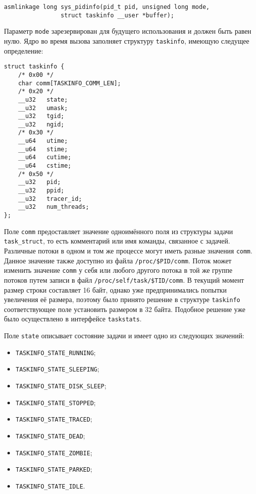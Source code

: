 \medskip
\begin{lstlisting}[style=cstyle]
asmlinkage long sys_pidinfo(pid_t pid, unsigned long mode,
			    struct taskinfo __user *buffer);
\end{lstlisting}
\medskip

Параметр \texttt{mode} зарезервирован для будущего использования и должен быть
равен нулю. Ядро во время вызова заполняет структуру \texttt{taskinfo}, имеющую
следущее определение:

\medskip
\begin{lstlisting}[style=cstyle]
struct taskinfo {
	/* 0x00 */
	char comm[TASKINFO_COMM_LEN];
	/* 0x20 */
	__u32	state;
	__u32	umask;
	__u32	tgid;
	__u32	ngid;
	/* 0x30 */
	__u64	utime;
	__u64	stime;
	__u64	cutime;
	__u64	cstime;
	/* 0x50 */
	__u32	pid;
	__u32	ppid;
	__u32	tracer_id;
	__u32	num_threads;
};
\end{lstlisting}
\medskip

Поле \texttt{comm} предоставляет значение одноимённого поля из структуры задачи
\texttt{task\_struct}, то есть комментарий или имя команды, связанное с
задачей. Различные потоки в одном и том же процессе могут иметь разные значения
\texttt{comm}. Данное значение также доступно из файла
\texttt{/proc/\$PID/comm}. Поток может изменить значение \texttt{comm} у себя
или любого другого потока в той же группе потоков путем записи в файл
\texttt{/proc/self/task/\$TID/comm}. В текущий момент размер строки составляет
16 байт, однако уже предпринимались попытки увеличения её размера, поэтому было
принято решение в структуре \texttt{taskinfo} соответствующее поле установить
размером в 32 байта. Подобное решение уже было осуществлено в интерфейсе
\texttt{taskstats}.

Поле \texttt{state} описывает состояние задачи и имеет одно из следующих
значений:
\begin{itemize}
\item \texttt{TASKINFO\_STATE\_RUNNING};
\item \texttt{TASKINFO\_STATE\_SLEEPING};
\item \texttt{TASKINFO\_STATE\_DISK\_SLEEP};
\item \texttt{TASKINFO\_STATE\_STOPPED};
\item \texttt{TASKINFO\_STATE\_TRACED};
\item \texttt{TASKINFO\_STATE\_DEAD};
\item \texttt{TASKINFO\_STATE\_ZOMBIE};
\item \texttt{TASKINFO\_STATE\_PARKED};
\item \texttt{TASKINFO\_STATE\_IDLE}.
\end{itemize}

